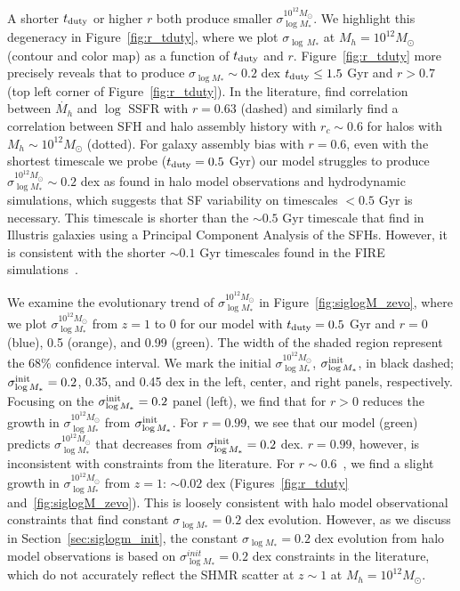 \documentclass[12pt, letterpaper, preprint, tighten]{aastex62}
\newcommand{\edt}[1]{{\color{dred}{\bf} #1}}
\newcommand{\tduty}{t_{\rm duty}}
\newcommand{\siglogm}{\sigma_{\log M_*}}
\begin{document}
A shorter $t_{\rm duty}$ or higher $r$ both produce smaller $\siglogm^{10^{12}M_\odot}$. 
We highlight this degeneracy in Figure~\ref{fig:r_tduty}, where we plot 
$\sigma_{\log\,M_*}$ at $M_h=10^{12}M_\odot$ (contour and color map) as 
a function of $t_{\rm duty}$ and $r$. 
\edt{Figure~\ref{fig:r_tduty} more precisely reveals that to produce $\siglogm \sim 0.2$ dex 
$\tduty \leq 1.5$ Gyr and $r > 0.7$ (top left corner of Figure~\ref{fig:r_tduty}).} 
In the literature, \cite{tinker2018b} find correlation
between $\dot{M_h}$ and $\log$ SSFR with $r = 0.63$ (dashed) and
\cite{behroozi2018} similarly find a correlation between SFH and halo
assembly history with $r_c \sim 0.6$ for halos with $M_h \sim 10^{12}M_\odot$
(dotted). 
\edt{For galaxy assembly bias with $r = 0.6$, even with the shortest timescale 
we probe ($t_{\rm duty} = 0.5$ Gyr) our model struggles to produce 
$\siglogm^{10^{12}M_\odot} \sim 0.2$ dex as found in halo model observations 
and hydrodynamic simulations, which suggests that SF variability on timescales 
$< 0.5$ Gyr is necessary. 
}
This timescale is shorter than the $\sim 0.5$ Gyr timescale that \cite{sparre2015} 
find in Illustris galaxies using a Principal Component Analysis of the SFHs. 
However, it is consistent with the shorter $\sim 0.1$ Gyr timescales found 
in the FIRE simulations~\citep{hopkins2014, sparre2017}.

\edt{We examine the evolutionary trend of $\siglogm^{10^{12}M_\odot}$ in Figure~\ref{fig:siglogM_zevo}, 
where we plot $\siglogm^{10^{12}M_\odot}$ from $z=1$ to 0 for our model with 
$t_{\rm duty} = 0.5$ Gyr and $r = 0$ (blue), 0.5 (orange), and 0.99 (green). The
width of the shaded region represent the $68\%$ confidence interval. We mark the
initial $\siglogm^{10^{12}M_\odot}$, $\siglogm^{\rm init}$, in black dashed; 
$\siglogm^{\rm init} = 0.2$, 0.35, and 0.45 dex in the left, center, and right 
panels, respectively. Focusing on the $\siglogm^{\rm init} = 0.2$ panel (left),
we find that for $r > 0$ reduces the growth in $\siglogm^{10^{12}M_\odot}$ from 
$\siglogm^{\rm init}$. For $r = 0.99$, we see that our model (green) predicts
$\siglogm^{10^{12}M_\odot}$ that decreases from $\siglogm^{\rm init} = 0.2$ 
dex. $r = 0.99$, however, is inconsistent with constraints from the literature. 
For $r \sim 0.6$~\citep{behroozi2018,tinker2018b}, we find a slight growth in 
$\siglogm^{10^{12}M_\odot}$ from $z=1$: $\sim0.02$ dex (Figures~\ref{fig:r_tduty} 
and~\ref{fig:siglogM_zevo}). This is loosely consistent with halo model observational 
constraints that find constant $\siglogm = 0.2$ dex evolution. However, as we 
discuss in Section~\ref{sec:siglogm_init}, the constant $\siglogm = 0.2$ dex 
evolution from halo model observations is based on $\siglogm^{init} = 0.2$ dex 
constraints in the literature, which do not accurately reflect the SHMR scatter 
at $z \sim 1$ at $M_h = 10^{12}M_\odot$. 
}
\end{document}
